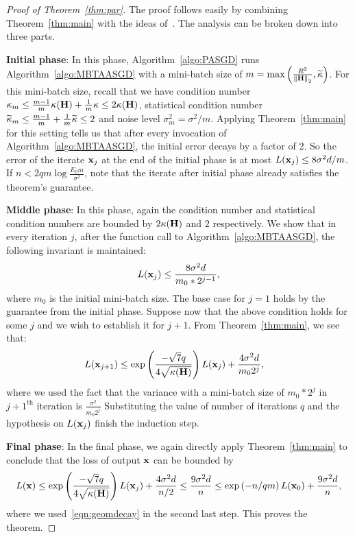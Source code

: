 \begin{proof}[Proof of Theorem~\ref{thm:par}]
	The proof follows easily by combining Theorem~\ref{thm:main} with the ideas of~\cite{JainKKNS16}. The analysis can be broken down into three parts.
	
	\textbf{Initial phase}: In this phase, Algorithm~\ref{algo:PASGD} runs Algorithm~\ref{algo:MBTAASGD} with a mini-batch size of $m = \max\left(\frac{\infbound}{\twonorm{\Cov}}, \cnS\right)$. For this mini-batch size, recall that we have condition number $\cnH_m \leq \frac{m-1}{m}\kappa(\Cov) + \frac{1}{m} \cnH \leq 2 \kappa(\Cov)$, statistical condition number $\cnS_m \leq \frac{m-1}{m} + \frac{1}{m} \cnS \leq 2$ and noise level $\sigma_m^2 = \sigma^2 / m$. Applying Theorem~\ref{thm:main} for this setting tells us that after every invocation of Algorithm~\ref{algo:MBTAASGD}, the initial error decays by a factor of $2$. So the error of the iterate $\xt[j]$ at the end of the initial phase is at most $L(\xt[j]) \leq 8 \sigma^2 d/m$. If $n < 2qm \log \frac{E_0 m}{\sigma^2}$, note that the iterate after initial phase already satisfies the theorem's guarantee.
	
	\textbf{Middle phase}: In this phase, again the condition number and statistical condition numbers are bounded by $2\kappa(\Cov)$ and $2$ respectively. We show that in every iteration $j$, after the function call to Algorithm~\ref{algo:MBTAASGD}, the following invariant is maintained:
	\begin{align}
		L(\xt[j]) \leq \frac{8 \sigma^2 d}{m_0*2^{j-1}},\label{eqn:geomdecay}
	\end{align}
	where $m_0$ is the initial mini-batch size.
	The base case for $j=1$ holds by the guarantee from the initial phase. Suppose now that the above condition holds for some $j$ and we wish to establish it for $j+1$. From Theorem~\ref{thm:main}, we see that:
	\begin{align*}
		L(\xt[j+1]) &\leq \exp\left(\frac{-\sqrt{7}q}{4\sqrt{\kappa(\Cov)}}\right) L(\xt[j]) + \frac{4 \sigma^2 d}{m_0 2^{j}},
	\end{align*}
	where we used the fact that the variance with a mini-batch size of $m_0*2^j$ in $j+1^{\textrm{th}}$ iteration is $\frac{\sigma^2}{m_0 2^j}$ Substituting the value of number of iterations $q$ and the hypothesis on $L(\xt[j])$ finish the induction step.
	
	\textbf{Final phase}: In the final phase, we again directly apply Theorem~\ref{thm:main} to conclude that the loss of output $\x$ can be bounded by
	\begin{align*}
		L(\x) \leq \exp\left(\frac{-\sqrt{7}q}{4\sqrt{\kappa(\Cov)}}\right) L(\xt[j]) + \frac{4 \sigma^2 d}{n/2} \leq \frac{9 \sigma^2 d}{n} \leq \exp\left(-n/qm\right) L(\xt[0]) + \frac{9 \sigma^2 d}{n},
	\end{align*}
	where we used~\eqref{eqn:geomdecay} in the second last step.
	This proves the theorem.
\end{proof}
\fi